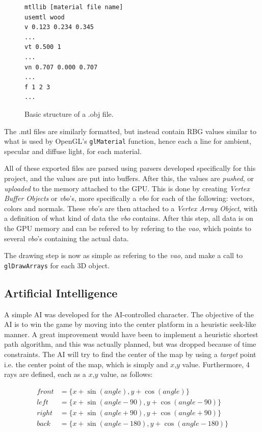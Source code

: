 \documentclass[12pt,a4paper,titlepage]{article}
\begin{document}
\begin{figure}
      \begin{verbatim}
mtllib [material file name]
usemtl wood
v 0.123 0.234 0.345
...
vt 0.500 1
...
vn 0.707 0.000 0.707
...
f 1 2 3
...
      \end{verbatim}
      \caption{Basic structure of a .obj file.}
      \label{fig:objfile}
\end{figure}

The .mtl files are similarly formatted, but instead contain RBG values
similar to what is used by OpenGL's \texttt{glMaterial} function, hence each a line
for ambient, specular and diffuse light, for each material.

All of these exported files are parsed using parsers developed specifically
for this project, and the values are put into buffers. After this, the values
are \emph{pushed}, or \emph{uploaded} to the memory attached to the GPU. This is done by creating
\emph{Vertex Buffer Objects} or \emph{vbo}'s, more specifically a \emph{vbo} for each of the
following: vectors, colors and normals.  These \emph{vbo}'s are then attached to a
\emph{Vertex Array Object}, with a definition of what kind of data the \emph{vbo}
contains. After this step, all data is on the GPU memory and can be refered
to by refering to the \emph{vao}, which points to several \emph{vbo}'s containing the
actual data.

The drawing step is now as simple as refering to the \emph{vao}, and make a call
to \texttt{glDrawArrays} for each 3D object.

\subsection*{Artificial Intelligence}
\label{sec-2-3}
A simple AI was developed for the AI-controlled character. The objective of the
AI is to win the game by moving into the center platform in a heuristic seek-like
manner. A great improvement would have been to implement a heuristic shortest
path algorithm, and this was actually planned, but was dropped because of
time constraints. The AI will try to find the center of the map by using a
\emph{target} point i.e. the center point of the map, which is simply and $x$,$y$
value. Furthermore, 4 rays are defined, each as a $x$,$y$ value, as follows:

\begin{align*}
front &= \{x + \sin(angle), y + \cos(angle)\}\\
left &= \{x + \sin(angle-90),  y + \cos(angle-90)\}\\
right &= \{x + \sin(angle+90), y + \cos(angle+90)\}\\
back &= \{x + \sin(angle-180), y + \cos(angle-180)\}
\end{align*}
\end{document}
